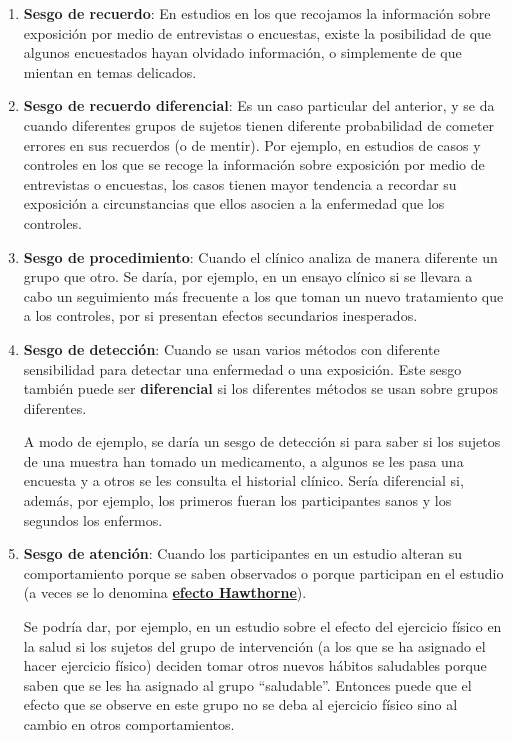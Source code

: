 \documentclass[
  spanish,
  letterpaper,
  DIV=11,
  numbers=noendperiod]{scrreprt}
\begin{document}
\begin{enumerate}
  \begin{enumerate}
  \def\labelenumii{\alph{enumii}.}
  \item
    \textbf{Sesgo de recuerdo}: En estudios en los que recojamos la
    información sobre exposición por medio de entrevistas o encuestas,
    existe la posibilidad de que algunos encuestados hayan olvidado
    información, o simplemente de que mientan en temas delicados.
  \item
    \textbf{Sesgo de recuerdo diferencial}: Es un caso particular del
    anterior, y se da cuando diferentes grupos de sujetos tienen
    diferente probabilidad de cometer errores en sus recuerdos (o de
    mentir). Por ejemplo, en estudios de casos y controles en los que se
    recoge la información sobre exposición por medio de entrevistas o
    encuestas, los casos tienen mayor tendencia a recordar su exposición
    a circunstancias que ellos asocien a la enfermedad que los
    controles.
  \item
    \textbf{Sesgo de procedimiento}: Cuando el clínico analiza de manera
    diferente un grupo que otro. Se daría, por ejemplo, en un ensayo
    clínico si se llevara a cabo un seguimiento más frecuente a los que
    toman un nuevo tratamiento que a los controles, por si presentan
    efectos secundarios inesperados.
  \item
    \textbf{Sesgo de detección}: Cuando se usan varios métodos con
    diferente sensibilidad para detectar una enfermedad o una
    exposición. Este sesgo también puede ser \textbf{diferencial} si los
    diferentes métodos se usan sobre grupos diferentes.

    A modo de ejemplo, se daría un sesgo de detección si para saber si
    los sujetos de una muestra han tomado un medicamento, a algunos se
    les pasa una encuesta y a otros se les consulta el historial
    clínico. Sería diferencial si, además, por ejemplo, los primeros
    fueran los participantes sanos y los segundos los enfermos.
  \item
    \textbf{Sesgo de atención}: Cuando los participantes en un estudio
    alteran su comportamiento porque se saben observados o porque
    participan en el estudio (a veces se lo denomina
    \href{https://es.wikipedia.org/wiki/Efecto_Hawthorne}{\textbf{efecto
    Hawthorne}}).

    Se podría dar, por ejemplo, en un estudio sobre el efecto del
    ejercicio físico en la salud si los sujetos del grupo de
    intervención (a los que se ha asignado el hacer ejercicio físico)
    deciden tomar otros nuevos hábitos saludables porque saben que se
    les ha asignado al grupo ``saludable''. Entonces puede que el efecto
    que se observe en este grupo no se deba al ejercicio físico sino al
    cambio en otros comportamientos.


\end{enumerate}
\end{enumerate}
\end{document}
